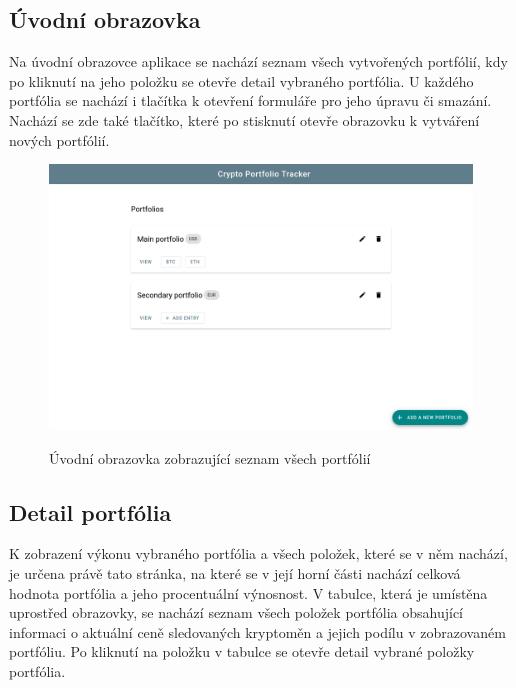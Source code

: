 \documentclass[12pt, a4paper]{article}
\begin{document}
    \subsection{Úvodní obrazovka}
    Na úvodní obrazovce aplikace se nachází seznam všech vytvořených portfólií, kdy po kliknutí na jeho položku se otevře detail vybraného portfólia.
    U každého portfólia se nachází i tlačítka k otevření formuláře pro jeho úpravu či smazání.
    Nachází se zde také tlačítko, které po stisknutí otevře obrazovku k vytváření nových portfólií.

    \begin{figure}[!ht]
        \centering
        {\includegraphics[width=\textwidth]{img/cpt-screenshots/portfolio-list.png}}
        \caption{Úvodní obrazovka zobrazující seznam všech portfólií}
        \label{fig:portfolio-list}
    \end{figure}

    \subsection{Detail portfólia}
    K zobrazení výkonu vybraného portfólia a všech položek, které se v něm nachází, je určena právě tato stránka,
    na které se v její horní části nachází celková hodnota portfólia a jeho procentuální výnosnost.
    V tabulce, která je umístěna uprostřed obrazovky, se nachází seznam všech položek portfólia obsahující informaci o
    aktuální ceně sledovaných kryptoměn a jejich podílu v zobrazovaném portfóliu.
    Po kliknutí na položku v tabulce se otevře detail vybrané položky portfólia.
\end{document}
